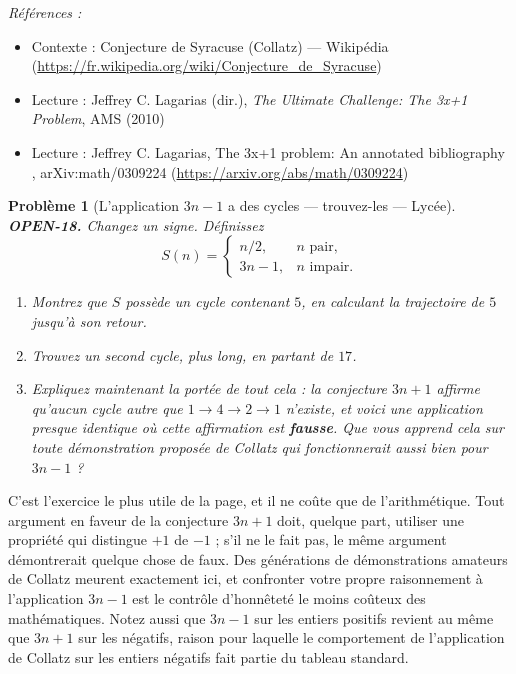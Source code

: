 \documentclass[11pt]{article}
\newtheorem{problem}{Problème}
\newenvironment{refs}{\par\small\noindent\emph{Références :}\begin{itemize}\setlength\itemsep{0pt}}{\end{itemize}\normalsize}
\begin{document}
\begin{refs}
\item Contexte : Conjecture de Syracuse (Collatz) --- Wikipédia (\url{https://fr.wikipedia.org/wiki/Conjecture_de_Syracuse})
\item Lecture : Jeffrey C. Lagarias (dir.), \textit{The Ultimate Challenge: The 3x+1 Problem}, AMS (2010)
\item Lecture : Jeffrey C. Lagarias, \og{} The 3x+1 problem: An annotated bibliography \fg{}, arXiv:math/0309224 (\url{https://arxiv.org/abs/math/0309224})
\end{refs}

\bigskip

\begin{problem}[{L'application $ 3n-1 $ a des cycles --- trouvez-les --- Lycée}]
\textbf{OPEN-18.} Changez un signe. Définissez
\[ S(n) = \begin{cases} n/2, & n \text{ pair},\\ 3n-1, & n \text{ impair}.\end{cases} \]
\begin{enumerate}
\item[(a)] Montrez que $ S $ possède un cycle contenant $ 5 $, en calculant la trajectoire de
$ 5 $ jusqu'à son retour.
\item[(b)] Trouvez un second cycle, plus long, en partant de $ 17 $.
\item[(c)] Expliquez maintenant la portée de tout cela : la conjecture $ 3n+1 $ affirme
qu'aucun cycle autre que $ 1 \to 4 \to 2 \to 1 $ n'existe, et voici une application
presque identique où cette affirmation est \textbf{fausse}. Que vous apprend cela sur toute
démonstration proposée de Collatz qui fonctionnerait aussi bien pour $ 3n-1 $ ?
\end{enumerate}

\end{problem}

\noindent C'est l'exercice le plus utile de la page, et il ne coûte que de
l'arithmétique. Tout argument en faveur de la conjecture $ 3n+1 $ doit, quelque part,
utiliser une propriété qui distingue $ +1 $ de $ -1 $ ; s'il ne le fait pas, le même
argument démontrerait quelque chose de faux. Des générations de \og{} démonstrations \fg{}
amateurs de Collatz meurent exactement ici, et confronter votre propre raisonnement à
l'application $ 3n-1 $ est le contrôle d'honnêteté le moins coûteux des mathématiques.
Notez aussi que $ 3n-1 $ sur les entiers positifs revient au même que $ 3n+1 $ sur les
négatifs, raison pour laquelle le comportement de l'application de Collatz sur les entiers
négatifs fait partie du tableau standard.
\end{document}
